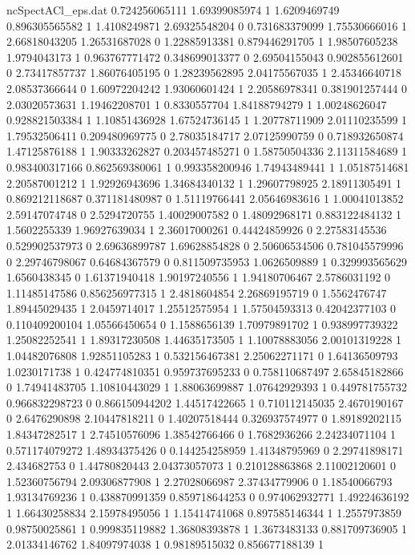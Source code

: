 \begin{filecontents}{ncSpectACl_eps.dat}
0.724256065111 1.69399085974 1
1.6209469749 0.896305565582 1
1.4108249871 2.69325548204 0
0.731683379099 1.75530666016 1
2.66818043205 1.26531687028 0
1.22885913381 0.879446291705 1
1.98507605238 1.9794043173 1
0.963767771472 0.348699013377 0
2.69504155043 0.902855612601 0
2.73417857737 1.86076405195 0
1.28239562895 2.04175567035 1
2.45346640718 2.08537366644 0
1.60972204242 1.93060601424 1
2.20586978341 0.381901257444 0
2.03020573631 1.19462208701 1
0.8330557704 1.84188794279 1
1.00248626047 0.928821503384 1
1.10851436928 1.67524736145 1
1.20778711909 2.01110235599 1
1.79532506411 0.209480969775 0
2.78035184717 2.07125990759 0
0.718932650874 1.47125876188 1
1.90333262827 0.203457485271 0
1.58750504336 2.11311584689 1
0.983400317166 0.862569380061 1
0.993358200946 1.74943489441 1
1.05187514681 2.20587001212 1
1.92926943696 1.34684340132 1
1.29607798925 2.18911305491 1
0.869212118687 0.371181480987 0
1.51119766441 2.05646983616 1
1.00041013852 2.59147074748 0
2.5294720755 1.40029007582 0
1.48092968171 0.883122484132 1
1.5602255339 1.96927639034 1
2.36017000261 0.44424859926 0
2.27583145536 0.529902537973 0
2.69636899787 1.69628854828 0
2.50606534506 0.781045579996 0
2.29746798067 0.64684367579 0
0.811509735953 1.0626509889 1
0.329993565629 1.6560438345 0
1.61371940418 1.90197240556 1
1.94180706467 2.5786031192 0
1.11485147586 0.856256977315 1
2.4818604854 2.26869195719 0
1.5562476747 1.89445029435 1
2.0459714017 1.25512575954 1
1.57504593313 0.42042377103 0
0.110409200104 1.05566450654 0
1.1588656139 1.70979891702 1
0.938997739322 1.25082252541 1
1.89317230508 1.44635173505 1
1.10078883056 2.00101319228 1
1.04482076808 1.92851105283 1
0.532156467381 2.25062271171 0
1.64136509793 1.0230171738 1
0.424774810351 0.959737695233 0
0.758110687497 2.65845182866 0
1.74941483705 1.10810443029 1
1.88063699887 1.07642929393 1
0.449781755732 0.966832298723 0
0.866150944202 1.44517422665 1
0.710112145035 2.4670190167 0
2.6476290898 2.10447818211 0
1.40207518444 0.326937574977 0
1.89189202115 1.84347282517 1
2.74510576096 1.38542766466 0
1.7682936266 2.24234071104 1
0.571174079272 1.48934375426 0
0.144254258959 1.41348795969 0
2.29741898171 2.434682753 0
1.44780820443 2.04373057073 1
0.210128863868 2.11002120601 0
1.52360756794 2.09306877908 1
2.27028066987 2.37434779906 0
1.18540066793 1.93134769236 1
0.438870991359 0.859718644253 0
0.974062932771 1.49224636192 1
1.66430258834 2.15978495056 1
1.15414741068 0.897585146344 1
1.2557973859 0.98750025861 1
0.999835119882 1.36808393878 1
1.3673483133 0.881709736905 1
2.01334146762 1.84097974038 1
0.98189515032 0.856677188139 1

\end{filecontents}
